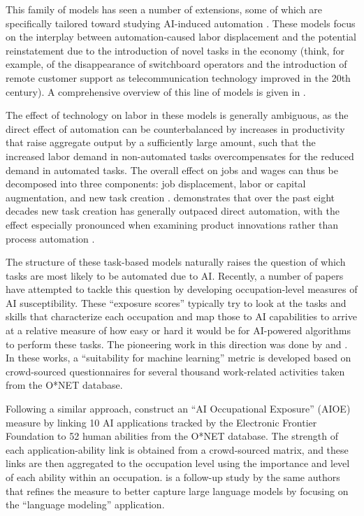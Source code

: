 \documentclass[11pt]{article}
\begin{document}
This family of models has seen a number of extensions, some of which are specifically tailored toward studying AI-induced automation \citep{Autor2003, acemoglu_automation_2019}. These models focus on the interplay between automation-caused labor displacement and the potential reinstatement due to the introduction of novel tasks in the economy (think, for example, of the disappearance of switchboard operators and the introduction of remote customer support as telecommunication technology improved in the 20th century). A comprehensive overview of this line of models is given in \citet{TasksAtWork}. 

The effect of technology on labor in these models is generally ambiguous, as the direct effect of automation can be counterbalanced by increases in productivity that raise aggregate output by a sufficiently large amount, such that the increased labor demand in non-automated tasks overcompensates for the reduced demand in automated tasks. The overall effect on jobs and wages can thus be decomposed into three components: job displacement, labor or capital augmentation, and new task creation \citep{acemoglu_automation_2019}. \citet{autor_outpace} demonstrates that over the past eight decades new task creation has generally outpaced direct automation, with the effect especially pronounced when examining product innovations rather than process automation \citep{Hall2011ProductProcess}.

The structure of these task-based models naturally raises the question of which tasks are most likely to be automated due to AI. Recently, a number of papers have attempted to tackle this question by developing occupation-level measures of AI susceptibility. These ``exposure scores'' typically try to look at the tasks and skills that characterize each occupation and map those to AI capabilities to arrive at a relative measure of how easy or hard it would be for AI-powered algorithms to perform these tasks. The pioneering work in this direction was done by \citet{brynjolfsson_what_2017} and \citet{brynjolfsson_what_2018}. In these works, a ``suitability for machine learning'' metric is developed based on crowd-sourced questionnaires for several thousand work-related activities taken from the O*NET database. 

Following a similar approach, \citet{felten_method_2018} construct an ``AI Occupational Exposure'' (AIOE) measure by linking 10 AI applications tracked by the Electronic Frontier Foundation to 52 human abilities from the O*NET database. The strength of each application-ability link is obtained from a crowd-sourced matrix, and these links are then aggregated to the occupation level using the importance and level of each ability within an occupation. \citet{felten_how_2023} is a follow-up study by the same authors that refines the measure to better capture large language models by focusing on the ``language modeling'' application.
\end{document}
